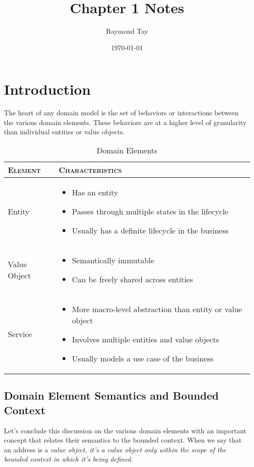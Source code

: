 \documentclass[a4paper,12pt]{article}
\begin{document}
\title{Chapter 1 Notes}
\author{Raymond Tay}
\date{\today}
\maketitle
\tableofcontents
\listoffigures
\listoftables
\newpage
{}

\section{Introduction}

The heart of any domain model is the set of behaviors or interactions between the various domain elements. These behaviors are at  a higher level of granularity than individual entities or value objects.

\vspace{3mm}

\begin{table}[h!]
\centering
\begin{tabular}{|l|p{}|}
\hline
\textsc{Element} & \textsc{Characteristics} \\
\hline
Entity & \begin{itemize}
              \item Has an entity
              \item Passes through multiple states in the lifecycle
              \item Usually has a definite lifecycle in the business
              \end{itemize} \\
\hline
Value Object & \begin{itemize}
\item Semantically immutable
\item Can be freely shared across entities
\end{itemize} \\
\hline
Service & \begin{itemize}
\item More macro-level abstraction than entity or value object
\item Involves multiple entities and value objects
\item Usually models a use case of the business
\end{itemize} \\
\hline
\end{tabular}
\caption{Domain Elements}
\end{table}

\subsection{Domain Element Semantics and Bounded Context}
Let's conclude this discussion on the various domain elements with an important concept that relates their semantics to the bounded context. When we say that an address is a \em{value object}\em, it's a value object only within the scope of the bounded context in which it's being defined.
\end{document}
